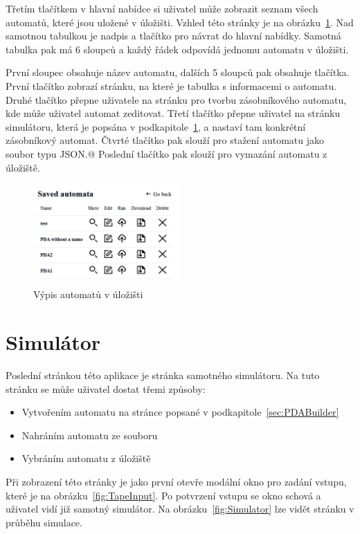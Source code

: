 Třetím tlačítkem v hlavní nabídce si uživatel může zobrazit seznam všech automatů, které jsou uložené v úložišti. Vzhled této stránky je na obrázku~\ref{fig:Storage}. Nad samotnou tabulkou je nadpis a tlačítko pro návrat do hlavní nabídky. Samotná tabulka pak má 6 sloupců a každý řádek odpovídá jednomu automatu v úložišti.

První sloupec obsahuje název automatu, dalších 5 sloupců pak obsahuje tlačítka. První tlačítko zobrazí stránku, na které je tabulka s informacemi o automatu. Druhé tlačítko přepne uživatele na stránku pro tvorbu zásobníkového automatu, kde může uživatel automat zeditovat. Třetí tlačítko přepne uživatel na stránku simulátoru, která je popsána v podkapitole~\ref{sec:SimulatorPage}, a nastaví tam konkrétní zásobníkový automat. Čtvrté tlačítko pak slouží pro stažení automatu jako soubor typu JSON.@ Poslední tlačítko pak slouží pro vymazání automatu z úložiště.

\begin{figure}[h]
    \centering
    \includegraphics[width=0.5\textwidth]{Figures/PrntScrn_UI_Storage.png}
    \caption{Výpis automatů v úložišti}\label{fig:Storage}
\end{figure}

\section{Simulátor}\label{sec:SimulatorPage}

Poslední stránkou této aplikace je stránka samotného simulátoru. Na tuto stránku se může uživatel dostat třemi způsoby:

\begin{itemize}
    \item Vytvořením automatu na stránce popsané v podkapitole~\ref{sec:PDABuilder}
    \item Nahráním automatu ze souboru
    \item Vybráním automatu z úložiště
\end{itemize}

Při zobrazení této stránky je jako první otevře modální okno pro zadání vstupu, které je na obrázku~\ref{fig:TapeInput}. Po potvrzení vstupu se okno schová a uživatel vidí již samotný simulátor. Na obrázku~\ref{fig:Simulator} lze vidět stránku v průběhu simulace.

